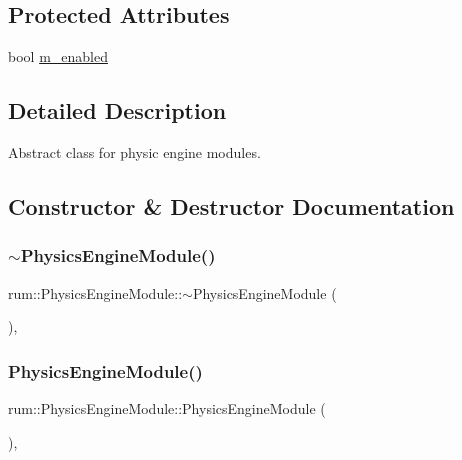 \subsection*{Protected Attributes}
\begin{DoxyCompactItemize}
\item 
bool \mbox{\hyperlink{classrum_1_1_physics_engine_module_acf8ef2890d8aed6c265d28e4e0288e88}{m\+\_\+enabled}}
\end{DoxyCompactItemize}


\subsection{Detailed Description}
Abstract class for physic engine modules. 

\subsection{Constructor \& Destructor Documentation}
\mbox{\label{classrum_1_1_physics_engine_module_a5ca9d6dd8dc60cec6c562f5aa80ecf64}} 
\subsubsection{\texorpdfstring{$\sim$\+Physics\+Engine\+Module()}{~PhysicsEngineModule()}}
{\footnotesize\ttfamily rum\+::\+Physics\+Engine\+Module\+::$\sim$\+Physics\+Engine\+Module (\begin{DoxyParamCaption}{ }\end{DoxyParamCaption})\hspace{0.3cm}{\ttfamily [virtual]}, {\ttfamily [default]}}

\mbox{\label{classrum_1_1_physics_engine_module_ab94c27f034522f95456f7736b50b6063}} 
\subsubsection{\texorpdfstring{Physics\+Engine\+Module()}{PhysicsEngineModule()}}
{\footnotesize\ttfamily rum\+::\+Physics\+Engine\+Module\+::\+Physics\+Engine\+Module (\begin{DoxyParamCaption}{ }\end{DoxyParamCaption})\hspace{0.3cm}{\ttfamily [explicit]}, {\ttfamily [protected]}}



